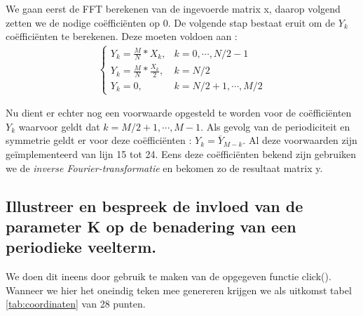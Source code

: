 \documentclass[10pt,a4paper]{article}
\begin{document}
We gaan eerst de FFT berekenen van de ingevoerde matrix x, daarop volgend zetten we de nodige co\"effici\"enten op 0. De volgende stap bestaat eruit om de $Y_k$ co\"effici\"enten te berekenen. Deze moeten voldoen aan :\\
\begin{eqnarray}
\begin{cases}
Y_k = \frac{M}{N}*X_k, & k = 0,\cdots ,N/2-1 \\
Y_k =\frac{M}{N}*\frac{X_k}{2}, & k = N/2\\
Y_k = 0, & k = N/2+1,\cdots ,M/2
\end{cases}
\end{eqnarray}

\newpage

Nu dient er echter nog een voorwaarde opgesteld te worden voor de co\"effici\"enten $Y_k$ waarvoor geldt dat $k = M/2+1,\cdots  ,M-1$. Als gevolg van de periodiciteit en symmetrie geldt er voor deze co\"effici\"enten : $Y_k=\overline{Y}_{M-k}$. Al deze voorwaarden zijn ge\"implementeerd van lijn 15 tot 24. Eens deze co\"effici\"enten bekend zijn gebruiken we de \emph{inverse Fourier-transformatie} en bekomen zo de resultaat matrix y. 


\subsection{Illustreer en bespreek de invloed van de parameter K op de benadering van een periodieke veelterm.}
We doen dit ineens door gebruik te maken van de opgegeven functie click(). Wanneer we hier het oneindig teken mee genereren krijgen we als uitkomst tabel \ref{tab:coordinaten} van 28 punten.
\end{document}
